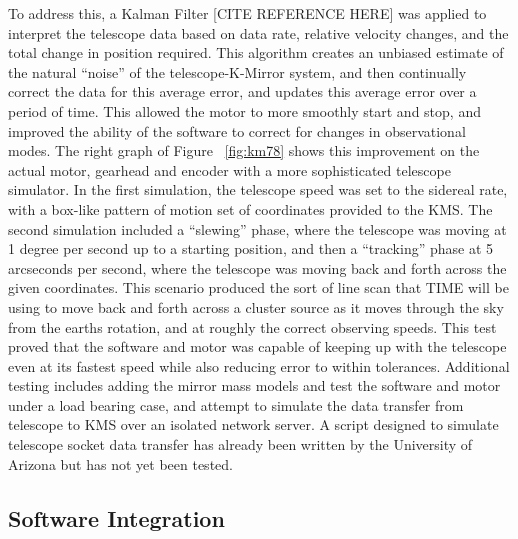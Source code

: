 \documentclass[manuscript]{aastex}
\begin{document}
To address this, a Kalman Filter [CITE REFERENCE HERE] was applied to interpret the telescope data based on data rate, relative velocity changes, and the total change in position required. This algorithm creates an unbiased estimate of the natural ``noise'' of the telescope-K-Mirror system, and then continually correct the data for this average error, and updates this average error over a period of time. This allowed the motor to more smoothly start and stop, and improved the ability of the software to correct for changes in observational modes. The right graph of Figure ~\ref{fig:km78} shows this improvement on the actual motor, gearhead and encoder with a more sophisticated telescope simulator. In the first simulation, the telescope speed was set to the sidereal rate, with a box-like pattern of motion set of coordinates provided to the KMS. The second simulation included a ``slewing'' phase, where the telescope was moving at 1 degree per second up to a starting position, and then a ``tracking'' phase at 5 arcseconds per second, where the telescope was moving back and forth across the given coordinates. This scenario produced the sort of line scan that TIME will be using to move back and forth across a cluster source as it moves through the sky from the earths rotation, and at roughly the correct observing speeds. This test proved that the software and motor was capable of keeping up with the telescope even at its fastest speed while also reducing error to within tolerances.  Additional testing includes adding the mirror mass models and test the software and motor under a load bearing case, and attempt to simulate the data transfer from telescope to KMS over an isolated network server. A script designed to simulate telescope socket data transfer has already been written by the University of Arizona but has not yet been tested. 

\subsection{Software Integration}
\end{document}
